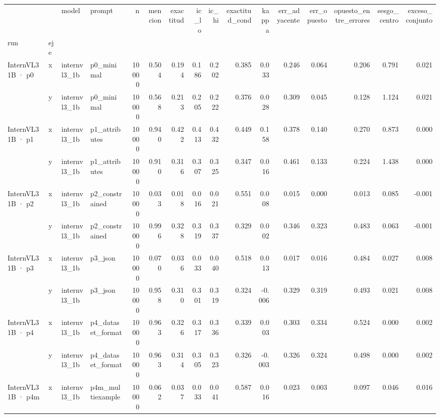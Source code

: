 \begin{tabular}{llllrrrrrrrrrrrr}
\toprule
 &  & model & prompt & n & mencion & exactitud & ic\_lo & ic\_hi & exactitud\_cond & kappa & err\_adyacente & err\_opuesto & opuesto\_entre\_errores & sesgo\_centro & exceso\_conjunto \\
run & eje &  &  &  &  &  &  &  &  &  &  &  &  &  &  \\
\midrule
\multirow[t]{2}{*}{InternVL3 1B · p0} & x & internvl3\_1b & p0\_minimal & 10000 & 0.504 & 0.194 & 0.186 & 0.202 & 0.385 & 0.033 & 0.246 & 0.064 & 0.206 & 0.791 & 0.021 \\
 & y & internvl3\_1b & p0\_minimal & 10000 & 0.568 & 0.213 & 0.205 & 0.222 & 0.376 & 0.028 & 0.309 & 0.045 & 0.128 & 1.124 & 0.021 \\
\cline{1-16}
\multirow[t]{2}{*}{InternVL3 1B · p1} & x & internvl3\_1b & p1\_attributes & 10000 & 0.940 & 0.422 & 0.413 & 0.432 & 0.449 & 0.158 & 0.378 & 0.140 & 0.270 & 0.873 & 0.000 \\
 & y & internvl3\_1b & p1\_attributes & 10000 & 0.910 & 0.316 & 0.307 & 0.325 & 0.347 & 0.016 & 0.461 & 0.133 & 0.224 & 1.438 & 0.000 \\
\cline{1-16}
\multirow[t]{2}{*}{InternVL3 1B · p2} & x & internvl3\_1b & p2\_constrained & 10000 & 0.033 & 0.018 & 0.016 & 0.021 & 0.551 & 0.008 & 0.015 & 0.000 & 0.013 & 0.085 & -0.001 \\
 & y & internvl3\_1b & p2\_constrained & 10000 & 0.996 & 0.328 & 0.319 & 0.337 & 0.329 & 0.002 & 0.346 & 0.323 & 0.483 & 0.063 & -0.001 \\
\cline{1-16}
\multirow[t]{2}{*}{InternVL3 1B · p3} & x & internvl3\_1b & p3\_json & 10000 & 0.070 & 0.036 & 0.033 & 0.040 & 0.518 & 0.013 & 0.017 & 0.016 & 0.484 & 0.027 & 0.008 \\
 & y & internvl3\_1b & p3\_json & 10000 & 0.958 & 0.310 & 0.301 & 0.319 & 0.324 & -0.006 & 0.329 & 0.319 & 0.493 & 0.021 & 0.008 \\
\cline{1-16}
\multirow[t]{2}{*}{InternVL3 1B · p4} & x & internvl3\_1b & p4\_dataset\_format & 10000 & 0.963 & 0.326 & 0.317 & 0.336 & 0.339 & 0.003 & 0.303 & 0.334 & 0.524 & 0.000 & 0.002 \\
 & y & internvl3\_1b & p4\_dataset\_format & 10000 & 0.963 & 0.314 & 0.305 & 0.323 & 0.326 & -0.003 & 0.326 & 0.324 & 0.498 & 0.000 & 0.002 \\
\cline{1-16}
\multirow[t]{2}{*}{InternVL3 1B · p4m} & x & internvl3\_1b & p4m\_multiexample & 10000 & 0.062 & 0.037 & 0.033 & 0.041 & 0.587 & 0.016 & 0.023 & 0.003 & 0.097 & 0.046 & 0.016 \\

\end{tabular}
